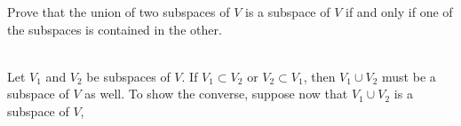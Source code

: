 \begin{exercise}
    Prove that the union of two subspaces of $V$ is a subspace of $V$ if and only if one of the subspaces is contained in the other. \\
\end{exercise}

\begin{solution}
    \\ Let $V_1$ and $V_2$ be subspaces of $V$. If $V_1 \subset V_2$ or $V_2 \subset V_1$, then $V_1 \cup V_2$ must be a subspace of $V$ as well. To show the converse, suppose now that $V_1 \cup V_2$ is a subspace of $V$, 
\end{solution}